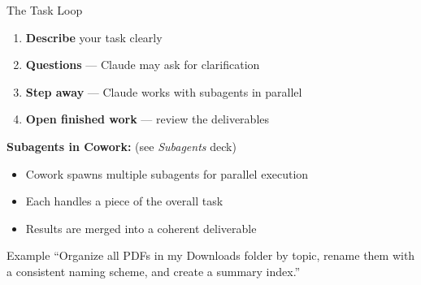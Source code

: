 \documentclass[aspectratio=169]{beamer}
\begin{document}
\begin{frame}{The Task Loop}
\begin{enumerate}
  \item \textbf{Describe} your task clearly
  \item \textbf{Questions} --- Claude may ask for clarification
  \item \textbf{Step away} --- Claude works with subagents in parallel
  \item \textbf{Open finished work} --- review the deliverables
\end{enumerate}

\bigskip
\textbf{Subagents in Cowork:} {\small(see \emph{Subagents} deck)}
\begin{itemize}
  \item Cowork spawns multiple subagents for parallel execution
  \item Each handles a piece of the overall task
  \item Results are merged into a coherent deliverable
\end{itemize}

\bigskip
\begin{exampleblock}{Example}
``Organize all PDFs in my Downloads folder by topic, rename them with a consistent naming scheme, and create a summary index.''
\end{exampleblock}
\end{frame}
\end{document}
